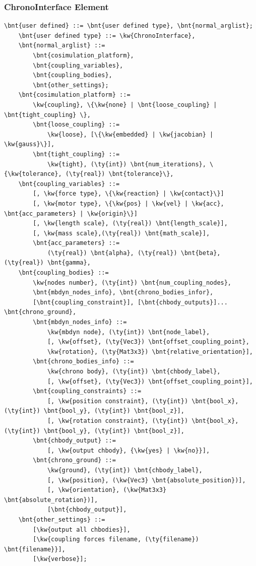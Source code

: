 \subsubsection{ChronoInterface Element}
\begin{Verbatim}[commandchars=\\\{\}]
	\bnt{user defined} ::= \bnt{user defined type}, \bnt{normal_arglist};
	\bnt{user defined type} ::= \kw{ChronoInterface},
	\bnt{normal_arglist} ::= 
		\bnt{cosimulation_platform}, 
		\bnt{coupling_variables}, 
		\bnt{coupling_bodies}, 
		\bnt{other_settings};
	\bnt{cosimulation_platform} ::= 
		\kw{coupling}, \{\kw{none} | \bnt{loose_coupling} | \bnt{tight_coupling} \}, 
		\bnt{loose_coupling} ::= 
			\kw{loose}, [\{\kw{embedded} | \kw{jacobian} | \kw{gauss}\}],
		\bnt{tight_coupling} ::= 
			\kw{tight}, (\ty{int}) \bnt{num_iterations}, \{\kw{tolerance}, (\ty{real}) \bnt{tolerance}\},
	\bnt{coupling_variables} ::= 
		[, \kw{force type}, \{\kw{reaction} | \kw{contact}\}]
		[, \kw{motor type}, \{\kw{pos} | \kw{vel} | \kw{acc}, \bnt{acc_parameters} | \kw{origin}\}]
		[, \kw{length scale}, (\ty{real}) \bnt{length_scale}],
		[, \kw{mass scale},(\ty{real}) \bnt{math_scale}],
		\bnt{acc_parameters} ::=
			(\ty{real}) \bnt{alpha}, (\ty{real}) \bnt{beta}, (\ty{real}) \bnt{gamma},
	\bnt{coupling_bodies} ::= 
		\kw{nodes number}, (\ty{int}) \bnt{num_coupling_nodes}, 
		\bnt{mbdyn_nodes_info}, \bnt{chrono_bodies_infor}, 
		[\bnt{coupling_constraint}], [\bnt{chbody_outputs}]... \bnt{chrono_ground},
		\bnt{mbdyn_nodes_info} ::= 
			\kw{mbdyn node}, (\ty{int}) \bnt{node_label}, 
			[, \kw{offset}, (\ty{Vec3}) \bnt{offset_coupling_point}, 
			\kw{rotation}, (\ty{Mat3x3}) \bnt{relative_orientation}],
		\bnt{chrono_bodies_info} ::= 
			\kw{chrono body}, (\ty{int}) \bnt{chbody_label},
			[, \kw{offset}, (\ty{Vec3}) \bnt{offset_coupling_point}],
		\bnt{coupling_constraints} ::= 
			[, \kw{position constraint}, (\ty{int}) \bnt{bool_x}, (\ty{int}) \bnt{bool_y}, (\ty{int}) \bnt{bool_z}],
			[, \kw{rotation constraint}, (\ty{int}) \bnt{bool_x}, (\ty{int}) \bnt{bool_y}, (\ty{int}) \bnt{bool_z}],
		\bnt{chbody_output} ::= 
			[, \kw{output chbody}, {\kw{yes} | \kw{no}}],
		\bnt{chrono_ground} ::= 
			\kw{ground}, (\ty{int}) \bnt{chbody_label}, 
			[, \kw{position}, (\kw{Vec3} \bnt{absolute_position})],
			[, \kw{orientation}, (\kw{Mat3x3} \bnt{absolute_rotation})],
			[\bnt{chbody_output}],
	\bnt{other_settings} ::= 
		[\kw{output all chbodies}], 
		[\kw{coupling forces filename, (\ty{filename}) \bnt{filename}}], 
		[\kw{verbose}];
\end{Verbatim}

